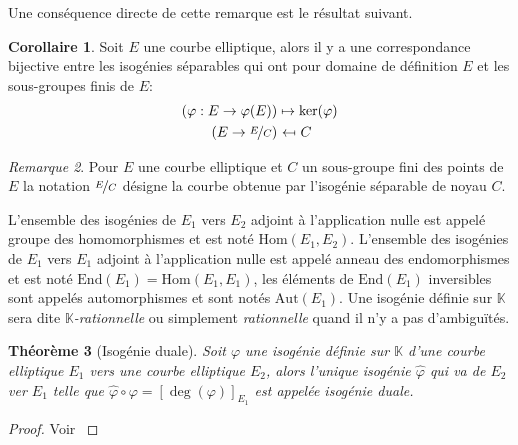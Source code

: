 \documentclass[10pt,a4paper]{book}
\theoremstyle{plain}
\newtheorem{thm}{Théorème}
\theoremstyle{definition}
\theoremstyle{definition}
\newtheorem{cor}[thm]{Corollaire}
\theoremstyle{definition}
\theoremstyle{definition}
\theoremstyle{remark}
\newtheorem{rem}[thm]{Remarque}
\theoremstyle{remark}
\begin{document}
Une conséquence directe de cette remarque est le résultat suivant.

\begin{cor}
Soit $E$ une courbe elliptique, alors il y a une correspondance bijective entre les isogénies séparables qui ont pour domaine de définition $E$ et les sous-groupes finis de $E$:
\begin{equation*}
\begin{alignedat}{1}
(\varphi :E\rightarrow \varphi(E)) &\mapsto  \ker(\varphi)  \\
 (E\rightarrow\nicefrac{E}{C})  &\  \reflectbox{$\mapsto$} \ C 
\end{alignedat}
\end{equation*}
\end{cor}

\begin{rem}
Pour $E$ une courbe elliptique et $C$ un sous-groupe fini des points de $E$ la notation $\nicefrac{E}{C}$ désigne la courbe obtenue par l'isogénie séparable de noyau $C$.
\end{rem}

L'ensemble des isogénies de $E_1$ vers $E_2$ adjoint à l'application nulle est appelé groupe des homomorphismes et est noté \emph{$\mathrm{Hom}(E_1,E_2)$}. L'ensemble des isogénies de $E_1$ vers $E_1$ adjoint à l'application nulle est appelé anneau des endomorphismes et est noté \emph{$\mathrm{End}(E_1)=\mathrm{Hom}(E_1,E_1)$}, les éléments de $\mathrm{End}(E_1)$ inversibles sont appelés automorphismes et sont notés \emph{$\mathrm{Aut}(E_1)$}. Une isogénie définie sur $\mathbb{K}$ sera dite \emph{$\mathbb{K}$-rationnelle} ou simplement \emph{rationnelle} quand il n'y a pas d'ambiguïtés.

\begin{thm}[Isogénie duale]
Soit $\varphi$ une isogénie définie sur $\mathbb{K}$ d'une courbe elliptique $E_1$ vers une courbe elliptique $E_2$, alors l'unique isogénie $\widehat{\varphi}$ qui va de $E_2$ ver $E_1$ telle que $\widehat{\varphi}\circ\varphi=[\deg(\varphi)]_{E_1}$ est appelée \emph{isogénie duale}.
\end{thm}

\begin{proof}
Voir \cite[III.6.1]{Silv1}
\end{proof}
\end{document}
